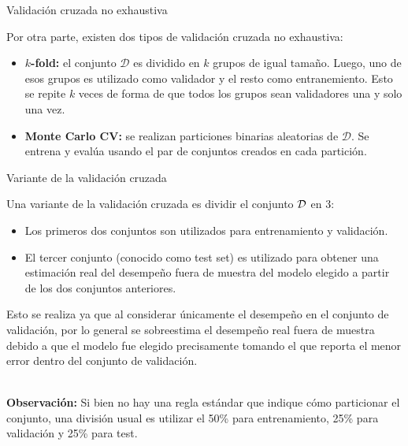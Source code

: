 \documentclass[9pt, handout]{beamer}
\begin{document}
\begin{frame}{Validación cruzada no exhaustiva}
	
Por otra parte, existen dos tipos de validación cruzada no exhaustiva: \pause
	
\begin{itemize}
	\item \textbf{$k$-fold:} el conjunto $\mathcal{D}$ es dividido en $k$ grupos de igual tamaño. Luego, uno de esos grupos es utilizado como validador y el resto como entranemiento. Esto se repite $k$ veces de forma de que todos los grupos sean validadores una y solo una vez.\pause
	\item \textbf{Monte Carlo CV:} se realizan particiones binarias aleatorias de $\mathcal{D}$. Se entrena y evalúa usando el par de conjuntos creados en cada partición.
\end{itemize}

\end{frame}

\begin{frame}{Variante de la validación cruzada}

Una variante de la validación cruzada es dividir el conjunto ${\mathcal D}$ en 3: \pause

\begin{itemize}
	\item Los primeros dos conjuntos son utilizados para entrenamiento y validación. \pause
	\item El tercer conjunto (conocido como test set) es utilizado para obtener una estimación real del desempeño fuera de muestra del modelo elegido a partir de los dos conjuntos anteriores. \pause
\end{itemize}

Esto se realiza ya que al considerar únicamente el desempeño en el conjunto de validación, por lo general se sobreestima el desempeño real fuera de muestra debido a que el modelo fue elegido precisamente tomando el que reporta el menor error dentro del conjunto de validación.\\~\ \pause

\textbf{Observación:} Si bien no hay una regla estándar que indique cómo particionar el conjunto, una división usual es utilizar el 50\% para entrenamiento, 25\% para validación y 25\% para test.
	
\end{frame}
\end{document}
